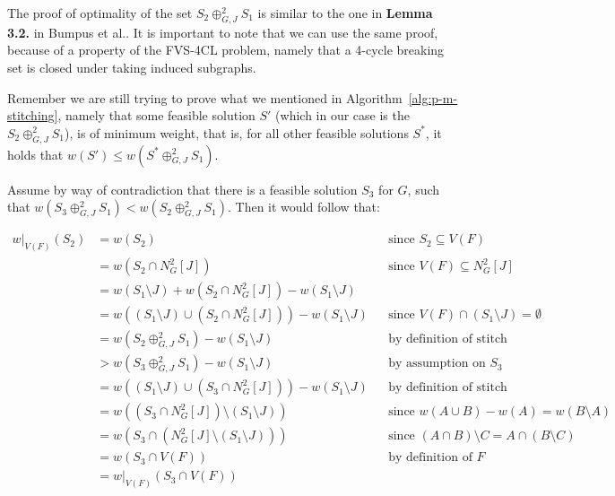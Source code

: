 \noindent The proof of optimality of the set $S_2 \oplus^{2}_{G,J} S_1$ is similar to the one in 
\textbf{Lemma 3.2.} in Bumpus et al.\cite{bumpus_et_al:LIPIcs.SWAT.2024.19}. It is important to note 
that we can use the same proof, because of a property of the FVS-4CL problem, namely that 
a 4-cycle breaking set is closed under taking induced subgraphs.

\noindent Remember we are still trying to prove what we mentioned in Algorithm~\ref{alg:p-m-stitching},
namely that some feasible solution $S'$ (which in our case is the $S_2 \oplus^{2}_{G,J} S_1$), is of minimum weight,
that is, for all other feasible solutions $S^{*}$, it holds that $w(S') \leq w(S^{*} \oplus^{2}_{G,J} S_1)$.

\noindent Assume by way of contradiction that there is a feasible solution $S_3$ for $G$,
such that $w(S_3 \oplus^{2}_{G,J} S_1) < w(S_2 \oplus^{2}_{G,J} S_1)$. Then it would follow that:

\[
\begin{aligned}
w|_{V(F)}(S_2) &= w(S_2) && \text{since } S_2 \subseteq V(F) \text{} \\
&= w(S_2 \cap N^{2}_{G}[J]) && \text{since } V(F) \subseteq N^{2}_{G}[J] \\
&= w(S_1 \setminus J) + w(S_2 \cap N^{2}_{G}[J]) - w(S_1 \setminus J)  \\
&= w((S_1 \setminus J) \cup (S_2 \cap N^{2}_{G}[J])) - w(S_1 \setminus J) && \text{since } V(F) \cap (S_1 \setminus J) = \emptyset \\
&= w(S_2 \oplus^{2}_{G,J} S_1) - w(S_1 \setminus J) && \text{by definition of stitch} \\
&> w(S_3 \oplus^{2}_{G,J} S_1) - w(S_1 \setminus J) && \text{by assumption on } S_3 \\
&= w((S_1 \setminus J) \cup (S_3 \cap N^{2}_{G}[J])) - w(S_1 \setminus J) && \text{by definition of stitch} \\
&= w((S_3 \cap N^{2}_{G}[J]) \setminus (S_1 \setminus J)) && \text{since } w(A \cup B) - w(A) = w(B \setminus A)  \\
&= w(S_3 \cap (N^{2}_{G}[J] \setminus (S_1 \setminus J))) && \text{since } (A \cap B) \setminus C = A \cap (B \setminus C)  \\
&= w(S_3 \cap V(F)) && \text{by definition of } F \\
&= w|_{V(F)}(S_3 \cap V(F))
\end{aligned}
\]


